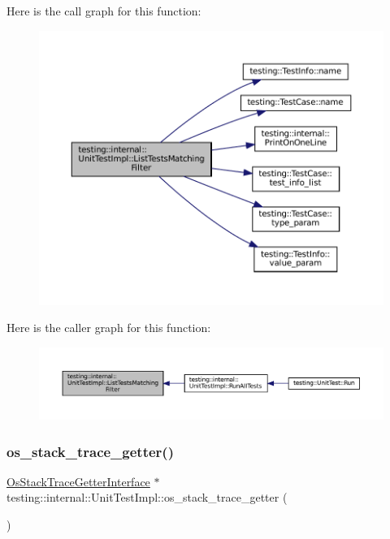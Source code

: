 Here is the call graph for this function\+:
\nopagebreak
\begin{figure}[H]
\begin{center}
\leavevmode
\includegraphics[width=350pt]{classtesting_1_1internal_1_1UnitTestImpl_ad2cfedef41d3d29aad23c2c64214e6f3_cgraph}
\end{center}
\end{figure}
Here is the caller graph for this function\+:
\nopagebreak
\begin{figure}[H]
\begin{center}
\leavevmode
\includegraphics[width=350pt]{classtesting_1_1internal_1_1UnitTestImpl_ad2cfedef41d3d29aad23c2c64214e6f3_icgraph}
\end{center}
\end{figure}
\mbox{\label{classtesting_1_1internal_1_1UnitTestImpl_a71753679854f7fbba6c1568eb422fecb}} 
\subsubsection{\texorpdfstring{os\+\_\+stack\+\_\+trace\+\_\+getter()}{os\_stack\_trace\_getter()}}
{\footnotesize\ttfamily \hyperlink{classtesting_1_1internal_1_1OsStackTraceGetterInterface}{Os\+Stack\+Trace\+Getter\+Interface} $\ast$ testing\+::internal\+::\+Unit\+Test\+Impl\+::os\+\_\+stack\+\_\+trace\+\_\+getter (\begin{DoxyParamCaption}{ }\end{DoxyParamCaption})}



